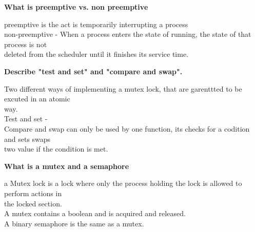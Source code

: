 \documentclass[a4paper,10pt,titlepage]{report}
\begin{document}
\textbf{What is preemptive vs. non preemptive \\}

\hspace{10mm}  preemptive is the act is  temporarily interrupting a process\\

\hspace{10mm}  non-preemptive -  When a process enters the state of running, the state of that process is not \\ \hspace{10mm} deleted from the scheduler until it finishes its service time.\\ \vspace{5mm}




\textbf{Describe "test and set" and "compare and swap". \\}

\hspace{10mm}  Two different ways of implementing a mutex lock, that are garenttted to be excuted in an atomic \\ \hspace{10mm} way.\\

\hspace{10mm} Test and set - \\

\hspace{10mm}  Compare and swap can only be used by one function, its checks for a codition and sets swaps \\ \hspace{10mm}  two value if the condition is met.\\  \vspace{5mm}




\textbf{What is a mutex and a semaphore \\}

\hspace{10mm}  a Mutex lock is a lock where only the process holding the lock is allowed to perform actions in \\ \hspace{10mm}  	the locked section. \\
\hspace{10mm}  A mutex contains a boolean and is acquired and released.\\


\hspace{10mm}  A binary semaphore is the same as a mutex. \\
\end{document}
